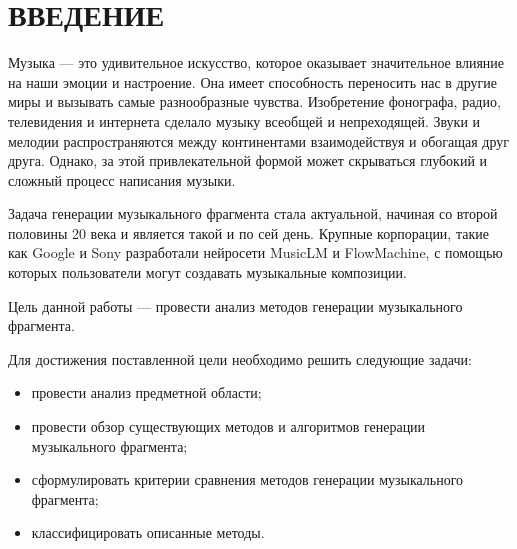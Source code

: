 \chapter*{ВВЕДЕНИЕ}

Музыка --- это удивительное искусство, которое оказывает значительное влияние на наши эмоции и настроение.
Она имеет способность переносить нас в другие миры и вызывать самые разнообразные чувства. Изобретение фонографа, радио, телевидения и интернета сделало музыку всеобщей и непреходящей. Звуки и мелодии распространяются между континентами взаимодействуя и обогащая друг друга. Однако, за этой привлекательной формой может скрываться глубокий и сложный процесс написания музыки.

Задача генерации музыкального фрагмента стала актуальной, начиная со второй половины 20 века и является такой и по сей день. Крупные корпорации, такие как Google и Sony разработали нейросети MusicLM и FlowMachine, с помощью которых пользователи могут создавать музыкальные композиции.

Цель данной работы --- провести анализ методов генерации музыкального фрагмента.

Для достижения поставленной цели необходимо решить следующие задачи:
\begin{itemize}
	\item провести анализ предметной области;
	\item провести обзор существующих методов и алгоритмов генерации музыкального фрагмента;
	\item сформулировать критерии сравнения методов генерации музыкального фрагмента;
	\item классифицировать описанные методы.
\end{itemize}